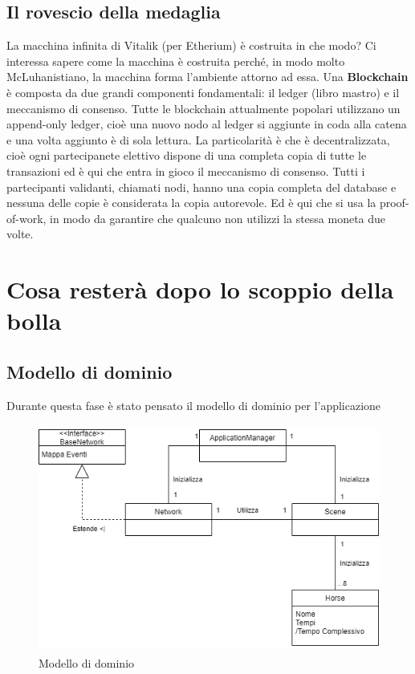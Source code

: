    \subsection{Il rovescio della medaglia}

    La macchina infinita di Vitalik (per Etherium) è costruita in che modo?
    Ci interessa sapere come la macchina è costruita perché, in modo molto McLuhanistiano, la macchina forma l'ambiente attorno ad essa. 
    Una \textbf{Blockchain} è composta da due grandi componenti fondamentali: il ledger (libro mastro) e il meccanismo di consenso. 
    Tutte le blockchain attualmente popolari utilizzano un append-only ledger, cioè una nuovo nodo al ledger si aggiunte in coda alla catena e una volta aggiunto è di sola lettura.
    La particolarità è che è decentralizzata, cioè ogni partecipanete elettivo dispone di una completa copia di tutte le transazioni ed è qui che entra in gioco il meccanismo di consenso.
    Tutti i partecipanti validanti, chiamati nodi, hanno una copia completa del database e nessuna delle copie è considerata la copia autorevole.
    Ed è qui che si usa la proof-of-work, in modo da garantire che qualcuno non utilizzi la stessa moneta due volte.


    \section{Cosa resterà dopo lo scoppio della bolla}

    

    \subsection{Modello di dominio}

    Durante questa fase è stato pensato il modello di dominio per l'applicazione 

    \begin{figure}[!ht]
        \centering
        \includegraphics[height=7.5cm]{figure/Modello_di_Dominio_Metarace.png}
        \caption{Modello di dominio}
    \end{figure}

